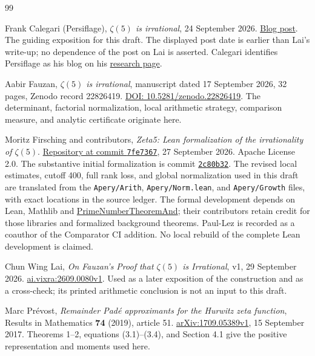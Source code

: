 \begin{thebibliography}{99}

Frank Calegari (Persiflage),
\emph{\(\zeta(5)\) is irrational}, 24 September 2026.
\href{https://galoisrepresentations.org/2026/09/24/zeta5-is-irrational/}{Blog post}.
The guiding exposition for this draft. The displayed post date is earlier
than Lai's write-up; no dependence of the post on Lai is asserted.
Calegari identifies Persiflage as his blog on his
\href{https://math.uchicago.edu/~fcale/research.html}{research page}.

Aabir Fauzan,
\emph{\(\zeta(5)\) is irrational}, manuscript dated 17 September 2026,
32 pages, Zenodo record 22826419.
\href{https://zenodo.org/records/22826419}{DOI: 10.5281/zenodo.22826419}.
The determinant, factorial normalization, local arithmetic strategy,
comparison measure, and analytic certificate originate here.

Moritz Firsching and contributors,
\emph{Zeta5: Lean formalization of the irrationality of \(\zeta(5)\)}.
\href{https://github.com/mo271/Zeta5/tree/7fe736760f4b96bfdb4334b68e3b3124ecbe10b0}{Repository at commit
\texttt{7fe7367}}, 27 September 2026. Apache License 2.0.
The substantive initial formalization is commit
\href{https://github.com/mo271/Zeta5/commit/2c80b320d06b4395605edbd413649d19094507af}{\texttt{2c80b32}}.
The revised local estimates, cutoff 400, full rank loss, and global
normalization used in this draft are translated from the
\texttt{Apery/Arith}, \texttt{Apery/Norm.lean}, and
\texttt{Apery/Growth} files, with exact locations in the source ledger.
The formal development depends on Lean, Mathlib and
\href{https://github.com/mo271/PrimeNumberTheoremAnd/tree/04d81b2a68ea3548b9990813fdc463c78511f412}{PrimeNumberTheoremAnd};
their contributors retain credit for those libraries and formalized
background theorems. Paul-Lez is recorded as a coauthor of the Comparator
CI addition. No local rebuild of the complete Lean development is claimed.

Chun Wing Lai,
\emph{On Fauzan's Proof that \(\zeta(5)\) is Irrational},
v1, 29 September 2026.
\href{https://ai.vixra.org/pdf/2609.0080v1.pdf}{ai.vixra:2609.0080v1}.
Used as a later exposition of the construction and as a cross-check;
its printed arithmetic conclusion is not an input to this draft.

Marc Pr\'evost,
\emph{Remainder Pad\'e approximants for the Hurwitz zeta function},
Results in Mathematics \textbf{74} (2019), article 51.
\href{https://arxiv.org/pdf/1709.05389v1}{arXiv:1709.05389v1},
15 September 2017. Theorems 1--2, equations (3.1)--(3.4), and Section 4.1
give the positive representation and moments used here.


\end{thebibliography}
